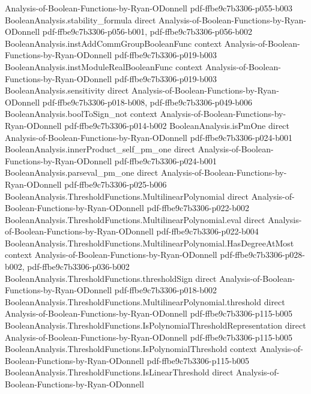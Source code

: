 \begin{lemma}
  {Analysis-of-Boolean-Functions-by-Ryan-ODonnell}
  {pdf-ffbe9c7b3306-p055-b003}
\proofstep
  {BooleanAnalysis.stability_formula}
  {direct}
  {Analysis-of-Boolean-Functions-by-Ryan-ODonnell}
  {pdf-ffbe9c7b3306-p056-b001,
    pdf-ffbe9c7b3306-p056-b002}
\proofstep
  {BooleanAnalysis.instAddCommGroupBooleanFunc}
  {context}
  {Analysis-of-Boolean-Functions-by-Ryan-ODonnell}
  {pdf-ffbe9c7b3306-p019-b003}
\proofstep
  {BooleanAnalysis.instModuleRealBooleanFunc}
  {context}
  {Analysis-of-Boolean-Functions-by-Ryan-ODonnell}
  {pdf-ffbe9c7b3306-p019-b003}
\proofstep
  {BooleanAnalysis.sensitivity}
  {direct}
  {Analysis-of-Boolean-Functions-by-Ryan-ODonnell}
  {pdf-ffbe9c7b3306-p018-b008,
    pdf-ffbe9c7b3306-p049-b006}
\proofstep
  {BooleanAnalysis.boolToSign_not}
  {context}
  {Analysis-of-Boolean-Functions-by-Ryan-ODonnell}
  {pdf-ffbe9c7b3306-p014-b002}
\proofstep
  {BooleanAnalysis.isPmOne}
  {direct}
  {Analysis-of-Boolean-Functions-by-Ryan-ODonnell}
  {pdf-ffbe9c7b3306-p024-b001}
\proofstep
  {BooleanAnalysis.innerProduct_self_pm_one}
  {direct}
  {Analysis-of-Boolean-Functions-by-Ryan-ODonnell}
  {pdf-ffbe9c7b3306-p024-b001}
\proofstep
  {BooleanAnalysis.parseval_pm_one}
  {direct}
  {Analysis-of-Boolean-Functions-by-Ryan-ODonnell}
  {pdf-ffbe9c7b3306-p025-b006}
\proofstep
  {BooleanAnalysis.ThresholdFunctions.MultilinearPolynomial}
  {direct}
  {Analysis-of-Boolean-Functions-by-Ryan-ODonnell}
  {pdf-ffbe9c7b3306-p022-b002}
\proofstep
  {BooleanAnalysis.ThresholdFunctions.MultilinearPolynomial.eval}
  {direct}
  {Analysis-of-Boolean-Functions-by-Ryan-ODonnell}
  {pdf-ffbe9c7b3306-p022-b004}
\proofstep
  {BooleanAnalysis.ThresholdFunctions.MultilinearPolynomial.HasDegreeAtMost}
  {context}
  {Analysis-of-Boolean-Functions-by-Ryan-ODonnell}
  {pdf-ffbe9c7b3306-p028-b002,
    pdf-ffbe9c7b3306-p036-b002}
\proofstep
  {BooleanAnalysis.ThresholdFunctions.thresholdSign}
  {direct}
  {Analysis-of-Boolean-Functions-by-Ryan-ODonnell}
  {pdf-ffbe9c7b3306-p018-b002}
\proofstep
  {BooleanAnalysis.ThresholdFunctions.MultilinearPolynomial.threshold}
  {direct}
  {Analysis-of-Boolean-Functions-by-Ryan-ODonnell}
  {pdf-ffbe9c7b3306-p115-b005}
\proofstep
  {BooleanAnalysis.ThresholdFunctions.IsPolynomialThresholdRepresentation}
  {direct}
  {Analysis-of-Boolean-Functions-by-Ryan-ODonnell}
  {pdf-ffbe9c7b3306-p115-b005}
\proofstep
  {BooleanAnalysis.ThresholdFunctions.IsPolynomialThreshold}
  {context}
  {Analysis-of-Boolean-Functions-by-Ryan-ODonnell}
  {pdf-ffbe9c7b3306-p115-b005}
\proofstep
  {BooleanAnalysis.ThresholdFunctions.IsLinearThreshold}
  {direct}
  {Analysis-of-Boolean-Functions-by-Ryan-ODonnell}

\end{lemma}
